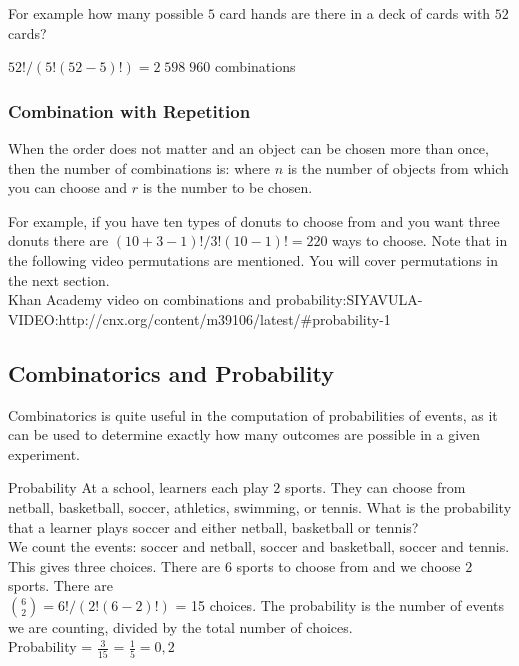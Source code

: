 For example how many possible $5$ card hands are there in a deck of cards with $52$ cards?

$52! / (5!(52-5)!) = 2\;598\;960$ combinations

\subsubsection{Combination with Repetition}

When the order does not matter and an object can be chosen more than once, then the number of combinations is:
where $n$ is the number of objects from which you can choose and $r$ is the number to be chosen.

For example, if you have ten types of donuts to choose from and you want three donuts there are $(10 + 3 - 1)! / 3!(10 - 1)! = 220$ ways to choose.
Note that in the following video permutations are mentioned. You will cover permutations in the next section.\\
Khan Academy video on combinations and probability:SIYAVULA-VIDEO:http://cnx.org/content/m39106/latest/#probability-1

\subsection{Combinatorics and Probability}
Combinatorics is quite useful in the computation of probabilities of events, as it can be used to determine exactly how many outcomes are possible in a given experiment.

\begin{wex}{Probability}
{At a school, learners each play $2$ sports. They can choose from netball, basketball, soccer, athletics, swimming, or tennis. What is the probability that a learner plays soccer and either netball, basketball or tennis?\\}
{
 We count the events: soccer and netball, soccer and basketball, soccer and tennis. This gives three choices.
There are $6$ sports to choose from and we choose $2$ sports. There are \\$\binom{6}{2} = 6!/(2!(6-2)!)$ = 15 choices.
 The probability is the number of events we are counting, divided by the total number of choices.\\
Probability = $\frac{3}{15}$ = $\frac{1}{5} = 0,2$
}
\end{wex}

